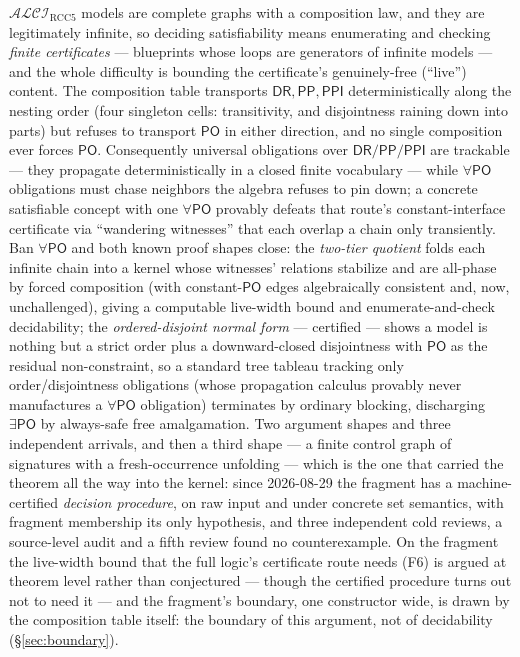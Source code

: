 \documentclass[11pt]{article}
\newcommand{\ALCIRCC}{\ensuremath{\mathcal{ALCI}_{\mathrm{RCC5}}}}
\newcommand{\DR}{\ensuremath{\mathsf{DR}}}
\newcommand{\PO}{\ensuremath{\mathsf{PO}}}
\newcommand{\PP}{\ensuremath{\mathsf{PP}}}
\newcommand{\PPI}{\ensuremath{\mathsf{PPI}}}
\begin{document}
$\ALCIRCC$ models are complete graphs with a composition law, and they
are legitimately infinite, so deciding satisfiability means enumerating
and checking \emph{finite certificates} --- blueprints whose loops are
generators of infinite models --- and the whole difficulty is bounding
the certificate's genuinely-free (``live'') content. The composition
table transports $\DR,\PP,\PPI$ deterministically along the nesting
order (four singleton cells: transitivity, and disjointness raining
down into parts) but refuses to transport $\PO$ in either direction,
and no single composition ever forces $\PO$. Consequently universal
obligations over $\DR/\PP/\PPI$ are trackable --- they propagate
deterministically in a closed finite vocabulary --- while $\forall\PO$
obligations must chase neighbors the algebra refuses to pin down; a
concrete satisfiable concept with one $\forall\PO$ provably defeats that
route's constant-interface certificate via ``wandering witnesses'' that
each overlap a chain only transiently. Ban $\forall\PO$ and both known
proof shapes close: the \emph{two-tier quotient} folds each infinite
chain into a kernel whose witnesses' relations stabilize and are
all-phase by forced composition (with constant-$\PO$ edges
algebraically consistent and, now, unchallenged), giving a computable
live-width bound and enumerate-and-check decidability; the
\emph{ordered-disjoint normal form} --- certified --- shows a model is
nothing but a strict order plus a downward-closed disjointness with
$\PO$ as the residual non-constraint, so a standard tree tableau
tracking only order/disjointness obligations (whose propagation
calculus provably never manufactures a $\forall\PO$ obligation)
terminates by ordinary blocking, discharging $\exists\PO$ by
always-safe free amalgamation. Two argument shapes and three independent
arrivals, and then a third shape --- a finite control graph of signatures
with a fresh-occurrence unfolding --- which is the one that carried the
theorem all the way into the kernel: since 2026-08-29 the fragment has a
machine-certified \emph{decision procedure}, on raw input and under concrete
set semantics, with fragment membership its only hypothesis, and three
independent cold reviews, a source-level audit and a fifth review found no
counterexample. On the fragment the live-width bound that the full logic's
certificate route needs (F6) is argued at theorem level rather than
conjectured --- though the certified procedure turns out not to need it ---
and the fragment's boundary, one constructor wide, is drawn by the composition
table itself: the boundary of this argument, not of decidability
(\S\ref{sec:boundary}).
\end{document}

